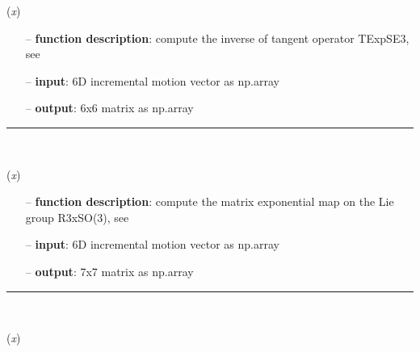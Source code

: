 \begin{itemize}[leftmargin=1.4cm]
\begin{itemize}[leftmargin=0.5cm]
\begin{itemize}[leftmargin=1.4cm]
\begin{itemize}[leftmargin=1.4cm]
\begin{itemize}[leftmargin=0.5cm]
\begin{itemize}[leftmargin=1.4cm]
\begin{itemize}[leftmargin=0.5cm]
\begin{itemize}[leftmargin=1.4cm]
\begin{itemize}[leftmargin=1.4cm]
\begin{itemize}[leftmargin=1.4cm]
\begin{itemize}[leftmargin=1.4cm]
\begin{itemize}[leftmargin=0.5cm]
\begin{flushleft}
\label{sec:lieGroupBasics:TExpSE3Inv}
({\it x})
\end{flushleft}
\setlength{\itemindent}{0.7cm}
\begin{itemize}[leftmargin=0.7cm]
  \item[--]  {\bf function description}: compute the inverse of tangent operator TExpSE3, see \cite{Sonneville2014}  \item[--]  {\bf input}: 6D incremental motion vector as np.array  \item[--]  {\bf output}: 6x6 matrix as np.array\vspace{12pt}\end{itemize}
%
\noindent\rule{8cm}{0.75pt}\vspace{1pt} \\ 
\begin{flushleft}
\label{sec:lieGroupBasics:ExpR3xSO3}
({\it x})
\end{flushleft}
\setlength{\itemindent}{0.7cm}
\begin{itemize}[leftmargin=0.7cm]
  \item[--]  {\bf function description}: compute the matrix exponential map on the Lie group R3xSO(3), see \cite{Bruels2011}  \item[--]  {\bf input}: 6D incremental motion vector as np.array  \item[--]  {\bf output}: 7x7 matrix as np.array\vspace{12pt}\end{itemize}
%
\noindent\rule{8cm}{0.75pt}\vspace{1pt} \\ 
\begin{flushleft}
\label{sec:lieGroupBasics:TExpR3xSO3}
({\it x})
\end{flushleft}
\setlength{\itemindent}{0.7cm}
\begin{itemize}[leftmargin=0.7cm]

\end{itemize}
\end{itemize}
\end{itemize}
\end{itemize}
\end{itemize}
\end{itemize}
\end{itemize}
\end{itemize}
\end{itemize}
\end{itemize}
\end{itemize}
\end{itemize}
\end{itemize}
